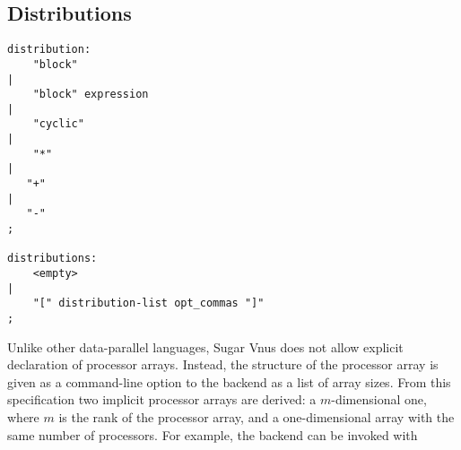 \documentclass[a4paper]{article}
\newcommand{\langnm}{Sugar Vnus}
\begin{document}
\subsection{Distributions}
\label{s.distributions}
\begin{verbatim}
distribution:
    "block"
|
    "block" expression
|
    "cyclic"
|
    "*"
|
   "+"
|
   "-"
;

distributions:
    <empty>
|
    "[" distribution-list opt_commas "]"
;
\end{verbatim}
Unlike other data-parallel languages, {\langnm} does
not allow explicit declaration of processor arrays. Instead, the
structure of the processor array is given as a command-line option
to the backend as a list of array sizes. From this specification two
implicit processor arrays are derived: a $m$-dimensional one, where
$m$ is the rank of the processor array, and a one-dimensional array
with the same number of processors.
For example, the backend can be invoked with
\end{document}
